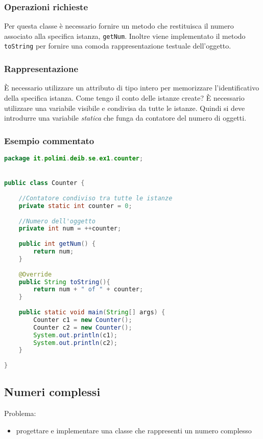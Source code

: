 \documentclass{article}
\begin{document}
\subsubsection{Operazioni richieste}

Per questa classe è necessario fornire un metodo che restituisca
il numero associato alla specifica istanza, \texttt{getNum}.
Inoltre viene implementato il metodo \texttt{toString} per fornire
una comoda rappresentazione testuale dell'oggetto.

\subsubsection{Rappresentazione}

È necessario utilizzare un attributo di tipo intero per memorizzare
l'identificativo della specifica istanza.
Come tengo il conto delle istanze create? È necessario utilizzare
una variabile visibile e condivisa da tutte le istanze.
Quindi si deve introdurre una variabile \emph{statica} che funga da contatore del numero di oggetti.

\subsubsection{Esempio commentato}
\begin{lstlisting}[language=Java,escapechar=|]
package it.polimi.deib.se.ex1.counter;


public class Counter {
	
	//Contatore condiviso tra tutte le istanze
	private static int counter = 0;
	
	//Numero dell'oggetto
	private int num = ++counter;
	
	public int getNum() {
		return num;
	}
	
	@Override
	public String toString(){
		return num + " of " + counter;
	}
	
	public static void main(String[] args) {
		Counter c1 = new Counter();
		Counter c2 = new Counter();
		System.out.println(c1);
		System.out.println(c2);
	}
	
}
\end{lstlisting}

\subsection{Numeri complessi}
Problema:
\begin{itemize}
\item  progettare e implementare una classe che rappresenti un numero complesso
\end{itemize}
\end{document}
